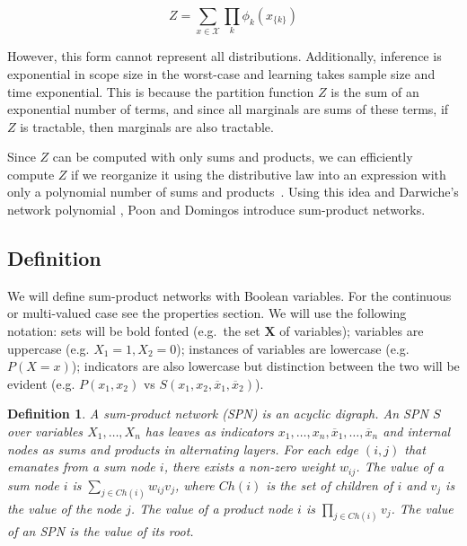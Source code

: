 \documentclass[a4paper,10pt]{article}
\theoremstyle{plain}
\newtheorem*{spn-def}{Definition}
\begin{document}
\begin{equation*}
  Z = \sum_{x\in \mathcal{X}} \prod_k \phi_k(x_{\{k\}})
\end{equation*}

However, this form cannot represent all distributions. Additionally, inference is exponential in
scope size in the worst-case and learning takes sample size and time exponential. This is because
the partition function $Z$ is the sum of an exponential number of terms, and since all marginals
are sums of these terms, if $Z$ is tractable, then marginals are also tractable.

Since $Z$ can be computed with only sums and products, we can efficiently compute $Z$ if we
reorganize it using the distributive law into an expression with only a polynomial number of sums
and products~\cite{poon-domingos}. Using this idea and Darwiche's network polynomial
\cite{diff-approach-darwiche}, Poon and Domingos introduce sum-product networks.

\subsection{Definition}

We will define sum-product networks with Boolean variables. For the continuous or multi-valued case
see the properties section. We will use the following notation: sets will be bold fonted (e.g.\ the
set $\mathbf{X}$ of variables); variables are uppercase (e.g. $X_1=1,X_2=0$); instances of
variables are lowercase (e.g. $P(X=x)$); indicators are also lowercase but distinction between the
two will be evident (e.g. $P(x_1,x_2)$ vs $S(x_1,x_2,\overline{x}_1,\overline{x}_2)$).

\begin{spn-def}
  A sum-product network (SPN) is an acyclic digraph. An SPN $S$ over variables $X_1,\ldots,X_n$ has
  leaves as indicators $x_1,\ldots,x_n,\overline{x}_1,\ldots,\overline{x}_n$ and internal nodes as
  sums and products in alternating layers. For each edge $(i,j)$ that emanates from a sum node $i$,
  there exists a non-zero weight $w_{ij}$. The value of a sum node $i$ is $\sum_{j\in Ch(i)}
  w_{ij}v_j$, where $Ch(i)$ is the set of children of $i$ and $v_j$ is the value of the node $j$.
  The value of a product node $i$ is $\prod_{j\in Ch(i)} v_j$. The value of an SPN is the value of
  its root.
\end{spn-def}
\end{document}
